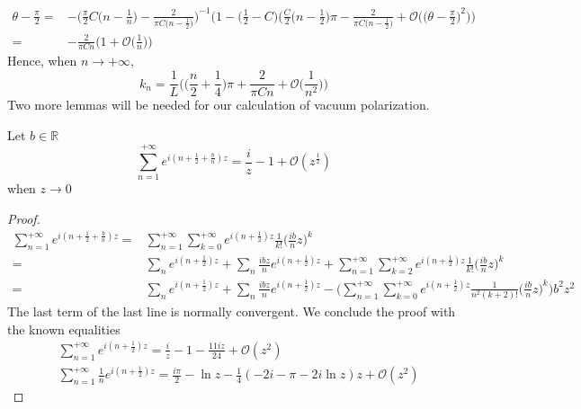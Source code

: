 \begin{equation*}
\begin{split}
\theta - \frac{\pi}{ 2} = & 
-\bigg(\frac{\pi}{2} C \big( n- \frac 1 n \big) - \frac{ 2}{ \pi C \big(n - \frac{ 1 }{2} \big)} \bigg)^{-1}
\bigg( 1 - \big(\frac{ 1}{ 2} - C \big)\Big( \frac C 2 \big( n - \frac{ 1}{ 2} \big) \pi - \frac{2}{\pi C\big(n- \frac{1}{2}\big)} + \mathcal{O}\Big(\big(\theta - \frac \pi 2 \big)^2\Big)\bigg) \\
%
=& -\frac{2}{\pi C n}\Big( 1 + \mathcal{O}\big( \frac 1 n\big) \Big)
\end{split}
\end{equation*}
Hence, when $n\rightarrow +\infty$, 
\begin{equation*}
k_n = \frac 1 L \Big( \big( \frac n 2 + \frac 1 4 \big)\pi + \frac{2}{\pi C n}+ \mathcal{O}\big(\frac{1}{n^2}\big) \Big)
\end{equation*}
Two more lemmas will be needed for our calculation of vacuum polarization.
\begin{lemma}
Let $b\in\mathbb{R}$
\begin{equation*}
\sum_{n=1}^{+\infty} e^{i(n + \frac 1 2+\frac b n)z} = \frac i z - 1 + \mathcal{O}(z^{\frac 1 2})
\end{equation*}
when $z\rightarrow 0 $
\end{lemma}
\begin{proof}
\begin{equation*}
\begin{split}
\sum_{n=1}^{+\infty} e^{i(n + \frac 1 2 +\frac b n)z} = & 
\sum_{n=1}^{+\infty} \sum_{k=0}^{+\infty} e^{i(n + \frac 1 2)z} \frac{1}{k!}\big(\frac{ib}{n}z\big)^k \\
%
= & \sum_n e^{i(n+\frac 1 2 )z} + \sum_n \frac{ibz}{n}e^{i(n+\frac 1 2 )z} + \sum_{n=1}^{+\infty} \sum_{k=2}^{+\infty} e^{i(n+\frac 1 2)z} \frac{1}{k!}\big(\frac{ib}{n}z\big)^k  \\
%
= & \sum_n e^{i(n+\frac 1 2)z} + \sum_n \frac{ibz}{n}e^{i(n+\frac 1 2)z} - 
\bigg(\sum_{n=1}^{+\infty} \sum_{k=0}^{+\infty} 
e^{i(n+\frac 1 2)z} \frac{1}{n^2(k+2)!}\big(\frac{ib}{n}z\big)^k 
\bigg)b^2z^2
\end{split}
\end{equation*}
The last term of the last line is normally convergent.
We conclude the proof with the known equalities
\begin{equation*}
\begin{split}
& \sum_{n=1}^{+\infty}e^{i(n + \frac 1 2 )z} = 
\frac i z - 1 - \frac{11iz}{24} + \mathcal{O}(z^2) \\
%
& \sum_{n=1}^{+\infty}\frac 1 n e^{i(n+\frac 1 2)z} =
\frac{i\pi}{2} - \ln z - \frac 1 4 (-2i - \pi - 2i\ln z)z + \mathcal{O}(z^2)
\end{split}
\end{equation*}
\end{proof}
